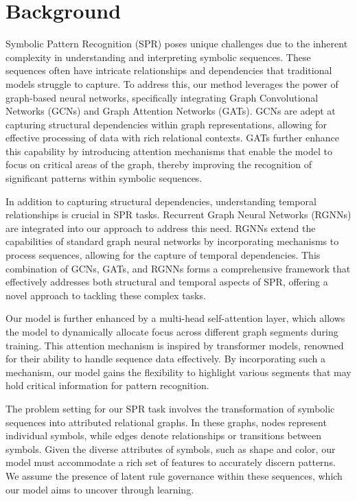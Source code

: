 \documentclass{article}
\begin{document}
\section{Background}
Symbolic Pattern Recognition (SPR) poses unique challenges due to the inherent complexity in understanding and interpreting symbolic sequences. These sequences often have intricate relationships and dependencies that traditional models struggle to capture. To address this, our method leverages the power of graph-based neural networks, specifically integrating Graph Convolutional Networks (GCNs) and Graph Attention Networks (GATs). GCNs are adept at capturing structural dependencies within graph representations, allowing for effective processing of data with rich relational contexts. GATs further enhance this capability by introducing attention mechanisms that enable the model to focus on critical areas of the graph, thereby improving the recognition of significant patterns within symbolic sequences.

In addition to capturing structural dependencies, understanding temporal relationships is crucial in SPR tasks. Recurrent Graph Neural Networks (RGNNs) are integrated into our approach to address this need. RGNNs extend the capabilities of standard graph neural networks by incorporating mechanisms to process sequences, allowing for the capture of temporal dependencies. This combination of GCNs, GATs, and RGNNs forms a comprehensive framework that effectively addresses both structural and temporal aspects of SPR, offering a novel approach to tackling these complex tasks.

Our model is further enhanced by a multi-head self-attention layer, which allows the model to dynamically allocate focus across different graph segments during training. This attention mechanism is inspired by transformer models, renowned for their ability to handle sequence data effectively. By incorporating such a mechanism, our model gains the flexibility to highlight various segments that may hold critical information for pattern recognition.

The problem setting for our SPR task involves the transformation of symbolic sequences into attributed relational graphs. In these graphs, nodes represent individual symbols, while edges denote relationships or transitions between symbols. Given the diverse attributes of symbols, such as shape and color, our model must accommodate a rich set of features to accurately discern patterns. We assume the presence of latent rule governance within these sequences, which our model aims to uncover through learning.
\end{document}
